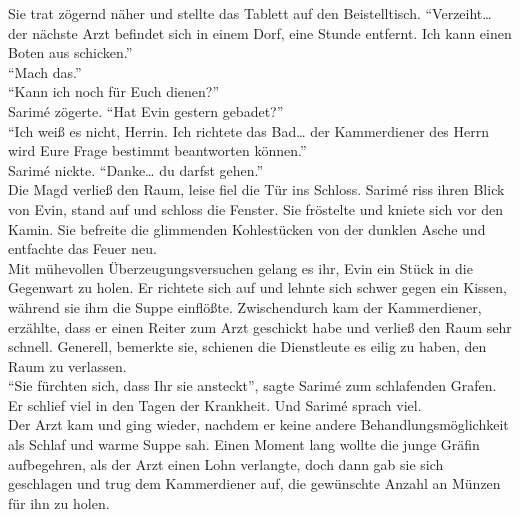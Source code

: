Sie trat zögernd näher und stellte das Tablett auf den Beistelltisch. ``Verzeiht… der nächste Arzt 
befindet sich in einem Dorf, eine Stunde entfernt. Ich kann einen Boten aus schicken.''\\
``Mach das.''\\
``Kann ich noch für Euch dienen?''\\
Sarimé zögerte. ``Hat Evin gestern gebadet?''\\
``Ich weiß es nicht, Herrin. Ich richtete das Bad… der Kammerdiener des Herrn wird Eure Frage 
bestimmt beantworten können.''\\
Sarimé nickte. ``Danke… du darfst gehen.''\\
Die Magd verließ den Raum, leise fiel die Tür ins Schloss. Sarimé riss ihren Blick von Evin, stand 
auf und schloss die Fenster. Sie fröstelte und kniete sich vor den Kamin. Sie befreite die 
glimmenden Kohlestücken von der dunklen Asche und entfachte das Feuer neu. \\
Mit mühevollen Überzeugungsversuchen gelang es ihr, Evin ein Stück in die Gegenwart zu holen. Er 
richtete sich auf und lehnte sich schwer gegen ein Kissen, während sie ihm die Suppe einflößte. 
Zwischendurch kam der Kammerdiener, erzählte, dass er einen Reiter zum Arzt geschickt habe und 
verließ den Raum sehr schnell. Generell, bemerkte sie, schienen die Dienstleute es eilig zu haben, 
den Raum zu verlassen. \\
``Sie fürchten sich, dass Ihr sie ansteckt'', sagte Sarimé zum schlafenden Grafen. Er schlief viel 
in den Tagen der Krankheit. Und Sarimé sprach viel. \\
Der Arzt kam und ging wieder, nachdem er keine andere Behandlungsmöglichkeit als Schlaf und warme 
Suppe sah. Einen Moment lang wollte die junge Gräfin aufbegehren, als der Arzt einen Lohn 
verlangte, doch dann gab sie sich geschlagen und trug dem Kammerdiener auf, die gewünschte Anzahl an 
Münzen für ihn zu holen. \\

